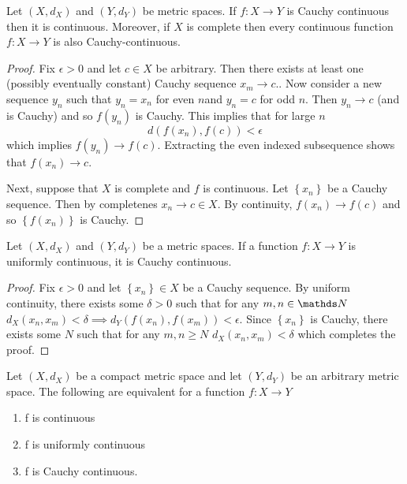 \begin{prop}
\label{prop:CauchyContinuityImpliesContinuity}Let $\left(X,d_{X}\right)$
and $\left(Y,d_{Y}\right)$ be metric spaces. If $f:X\to Y$ is Cauchy
continuous then it is continuous. Moreover, if $X$ is complete then
every continuous function $f:X\to Y$ is also Cauchy-continuous.
\end{prop}

\begin{proof}
Fix $\epsilon>0$ and let $c\in X$ be arbitrary. Then there exists
at least one (possibly eventually constant) Cauchy sequence $x_{m}\to c.$.
Now consider a new sequence $y_{n}$ such that $y_{n}=x_{n}$ for
even $n$and $y_{n}=c$ for odd $n.$ Then $y_{n}\to c$ (and is Cauchy)
and so $f\left(y_{n}\right)$ is Cauchy. This implies that for large
$n$
\[
d\left(f\left(x_{n}\right),f\left(c\right)\right)<\epsilon
\]
which implies $f\left(y_{n}\right)\to f\left(c\right).$ Extracting
the even indexed subsequence shows that $f\left(x_{n}\right)\to c.$

Next, suppose that $X$ is complete and $f$ is continuous. Let $\left\{ x_{n}\right\} $
be a Cauchy sequence. Then by completenes $x_{n}\to c\in X$. By continuity,
$f\left(x_{n}\right)\to f\left(c\right)$ and so $\left\{ f\left(x_{n}\right)\right\} $
is Cauchy.
\end{proof}
\begin{prop}
\label{prop:uniformContinuityImpliesCauchyContinuity}Let $\left(X,d_{X}\right)$
and $\left(Y,d_{Y}\right)$ be a metric spaces. If a function $f:X\to Y$
is uniformly continuous, it is Cauchy continuous.
\end{prop}

\begin{proof}
Fix $\epsilon>0$ and let $\left\{ x_{n}\right\} \in X$ be a Cauchy
sequence. By uniform continuity, there exists some $\delta>0$ such
that for any $m,n\in\N$ $d_{X}\left(x_{n},x_{m}\right)<\delta\implies d_{Y}\left(f\left(x_{n}\right),f\left(x_{m}\right)\right)<\epsilon.$
Since $\left\{ x_{n}\right\} $ is Cauchy, there exists some $N$
such that for any $m,n\geq N$ $d_{X}\left(x_{n},x_{m}\right)<\delta$
which completes the proof.
\end{proof}
\begin{thm}
\label{thm:compactUniformContinuity}Let $\left(X,d_{X}\right)$ be
a compact metric space and let $\left(Y,d_{Y}\right)$ be an arbitrary
metric space. The following are equivalent for a function $f:X\to Y$

\begin{enumerate}[label=(\roman*),leftmargin=.1\linewidth,rightmargin=.4\linewidth]
	\item f is continuous
	\item f is uniformly continuous
	\item f is Cauchy continuous.
\end{enumerate}
\end{thm}

